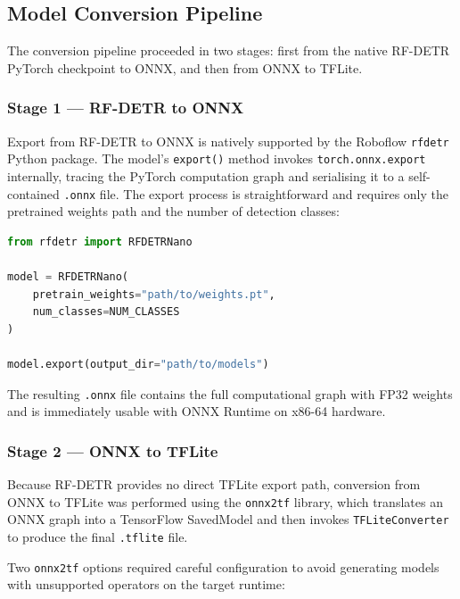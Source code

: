 \subsection{Model Conversion Pipeline}
\label{sec:conversion_pipeline}

The conversion pipeline proceeded in two stages: first from the native
RF-DETR PyTorch checkpoint to ONNX, and then from ONNX to TFLite.

\subsubsection{Stage 1 — RF-DETR to ONNX}

Export from RF-DETR to ONNX is natively supported by the Roboflow
\texttt{rfdetr} Python package. The model's \texttt{export()} method
invokes \texttt{torch.onnx.export} internally, tracing the PyTorch
computation graph and serialising it to a self-contained
\texttt{.onnx} file. The export process is straightforward and
requires only the pretrained weights path and the number of detection
classes:

\begin{lstlisting}[language=Python,
                   caption={RF-DETR Nano export to ONNX format.},
                   label={lst:rfdetr_export}]
from rfdetr import RFDETRNano

model = RFDETRNano(
    pretrain_weights="path/to/weights.pt",
    num_classes=NUM_CLASSES
)

model.export(output_dir="path/to/models")
\end{lstlisting}

The resulting \texttt{.onnx} file contains the full computational
graph with FP32 weights and is immediately usable with ONNX Runtime
on x86-64 hardware.

\subsubsection{Stage 2 — ONNX to TFLite}

Because RF-DETR provides no direct TFLite export path, conversion from
ONNX to TFLite was performed using the \texttt{onnx2tf} library, which
translates an ONNX graph into a TensorFlow SavedModel and then invokes
\texttt{TFLiteConverter} to produce the final \texttt{.tflite} file.

Two \texttt{onnx2tf} options required careful configuration to avoid
generating models with unsupported operators on the target runtime:

